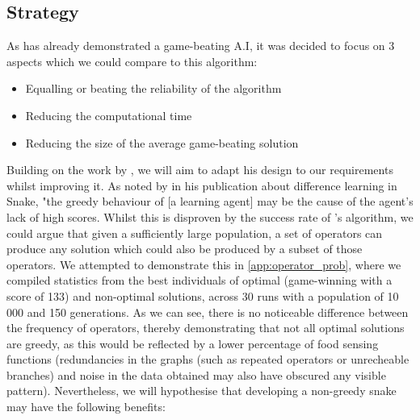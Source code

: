 \documentclass[british,10pt,a4paper]{article}
\begin{document}
\subsection{Strategy}
As \citet{Ehlis2000-sz} has already demonstrated a game-beating A.I, it was decided to focus on 3 aspects which we could compare to this algorithm:
\begin{itemize}
	\item Equalling or beating the reliability of the algorithm
	\item Reducing the computational time
	\item Reducing the size of the average game-beating solution
\end{itemize}
Building on the work by \citeauthor{Ehlis2000-sz}, we will aim to adapt his design to our requirements whilst improving it. As noted by \citet{Christopher_Lockhart2010-em} in his publication about difference learning in Snake, "the greedy behaviour of [a learning agent] may be the cause of the agent's lack of high scores. Whilst this is disproven by the success rate of \citeauthor{Ehlis2000-sz}'s algorithm, we could argue that given a sufficiently large population, a set of operators can produce any solution which could also be produced by a subset of those operators. We attempted to demonstrate this in \autoref{app:operator_prob}, where we compiled statistics from the best individuals of optimal (game-winning with a score of 133) and non-optimal solutions, across 30 runs with a population of 10 000 and 150 generations. As we can see, there is no noticeable difference between the frequency of operators, thereby demonstrating that not all optimal solutions are greedy, as this would be reflected by a lower percentage of food sensing functions (redundancies in the graphs (such as repeated operators or unrecheable branches) and noise in the data obtained may also have obscured any visible pattern). Nevertheless, we will hypothesise that developing a non-greedy snake may have the following benefits:
\end{document}
